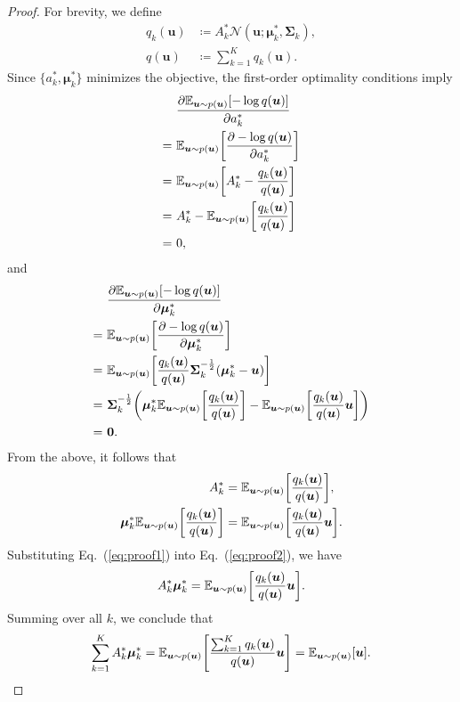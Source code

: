 \documentclass{article}
\def\vmu{{\bm{\mu}}}
\def\vu{{\bm{u}}}
\def\mSigma{{\bm{\Sigma}}}
\newcommand{\E}{\mathbb{E}}
\theoremstyle{custom}
\theoremstyle{definition}
\theoremstyle{remark}
\let\originalleft\left
\let\originalright\right
\renewcommand{\left}{\mathopen{}\mathclose\bgroup\originalleft}
\renewcommand{\right}{\aftergroup\egroup\originalright}
\let\originalpartial\partial
\renewcommand{\partial}{\mathop{}\!\mathrm{\originalpartial}}
\begin{document}
\begin{proof}
  For brevity, we define
  \begin{align}
      q_k(\vu) &\coloneqq  A_k^* \mathcal{N}(\vu; \vmu_k^*, \mSigma_k), \\
      q(\vu) &\coloneqq \sum_{k=1}^K q_k(\vu).
  \end{align}
  Since $\{a_k^*, \vmu_k^*\}$ minimizes the objective, the first-order optimality conditions imply
  \begin{align}
    &\ \frac{\partial \E_{\vu \sim p(\vu)}\left[-\log q(\vu) \right]}{\partial a_k^*} \notag\\
    =&\ \E_{\vu \sim p(\vu)}\left[\frac{\partial -\log q(\vu)}{\partial a_k^*} \right] \notag\\
    =&\ \E_{\vu \sim p(\vu)}\left[ A_k^* - \frac{q_k(\vu)}{q(\vu)} \right] \notag\\
    =&\ A_k^* - \E_{\vu \sim p(\vu)}\left[\frac{q_k(\vu)}{q(\vu)} \right] \notag\\
    =&\ 0,
  \end{align}
  and
  \begin{align} 
    &\ \frac{\partial \E_{\vu \sim p(\vu)}\left[-\log q(\vu) \right]}{\partial \vmu_k^*} \notag\\
    =&\ \E_{\vu \sim p(\vu)}\left[\frac{\partial -\log q(\vu)}{\partial \vmu_k^*} \right] \notag\\    
    =&\ \E_{\vu \sim p(\vu)}\left[ \frac{q_k(\vu)}{q(\vu)} \mSigma_k^{-\frac{1}{2}} (\vmu_k^* - \vu) \right] \notag\\
    =&\ \mSigma_k^{-\frac{1}{2}} \left( \vmu_k^* \E_{\vu \sim p(\vu)}\left[ \frac{q_k(\vu)}{q(\vu)} \right] - \E_{\vu \sim p(\vu)}\left[\frac{q_k(\vu)}{q(\vu)} \vu \right] \right)\notag\\
    =&\ \bm{0}.
  \end{align}
  From the above, it follows that
  \begin{align}
      A_k^* &= \E_{\vu \sim p(\vu)}\left[ \frac{q_k(\vu)}{q(\vu)} \right], \label{eq:proof1} \\
      \vmu_k^* \E_{\vu \sim p(\vu)}\left[ \frac{q_k(\vu)}{q(\vu)} \right] &= \E_{\vu \sim p(\vu)}\left[\frac{q_k(\vu)}{q(\vu)} \vu \right]. \label{eq:proof2}
  \end{align}
  Substituting Eq.~(\ref{eq:proof1}) into Eq.~(\ref{eq:proof2}), we have
  \begin{equation}
      A_k^* \vmu_k^* = \E_{\vu \sim p(\vu)}\left[\frac{q_k(\vu)}{q(\vu)} \vu \right].
  \end{equation}
  Summing over all $k$, we conclude that
  \begin{equation}
      \sum_{k=1}^K A_k^* \vmu_k^* = \E_{\vu \sim p(\vu)}\left[\frac{\sum_{k=1}^K q_k(\vu)}{q(\vu)} \vu \right] = \E_{\vu \sim p(\vu)}\left[ \vu \right].
  \end{equation}
\end{proof}
\end{document}
